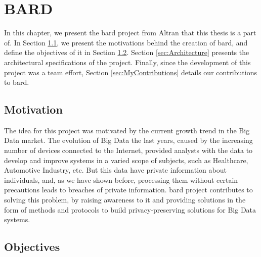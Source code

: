 %

\acresetall

\chapter{BARD}
\label{ch:BARD}


In this chapter, we present the \ac{bard} project from Altran that this thesis is a part of. 
In Section \ref{sec:Motivation}, we present the motivations behind the creation of \ac{bard}, and define the objectives of it in Section \ref{sec:Objectives}.
Section \ref{sec:Architecture} presents the architectural specifications of the project.
Finally, since the development of this project was a team effort, Section \ref{sec:MyContributions} details our contributions to \ac{bard}.



\section{Motivation}
\label{sec:Motivation}

The idea for this project was motivated by the current growth trend in the Big Data market. The evolution of Big Data the last years, caused by the increasing number of devices connected to the Internet, provided analysts with the data to develop and improve systems in a varied scope of subjects, such as Healthcare, Automotive Industry, etc. But this data have private information about individuals, and, as we have shown before, processing them without certain precautions leads to breaches of private information. \ac{bard} project contributes to solving this problem, by raising awareness to it and providing solutions in the form of methods and protocols to build privacy-preserving solutions for Big Data systems.

\section{Objectives}
\label{sec:Objectives}


